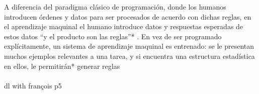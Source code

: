 A diferencia del paradigma clásico de programación, donde los humanos introducen órdenes y datos para ser procesados de acuerdo con dichas reglas, en el aprendizaje maquinal el humano introduce datos y respuestas esperadas de estos datos ``y el producto son las reglas''* . En vez de ser programado explícitamente, un sistema de aprendizaje maquinal es entrenado: se le presentan muchos ejemplos relevantes a una tarea, y si encuentra una estructura estadística en ellos, le permitirán* generar reglas
\\
\\
dl with françois p5